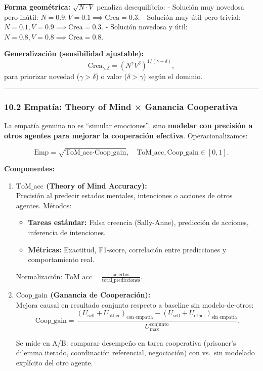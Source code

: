 \textbf{Forma geométrica:} \(\sqrt{N \cdot V}\) penaliza desequilibrio:
- Solución muy novedosa pero inútil:
\(N=0.9, V=0.1 \implies \text{Crea}=0.3\). - Solución muy útil pero
trivial: \(N=0.1, V=0.9 \implies \text{Crea}=0.3\). - Solución novedosa
y útil: \(N=0.8, V=0.8 \implies \text{Crea}=0.8\).

\textbf{Generalización (sensibilidad ajustable):} \[
\text{Crea}_{\gamma,\delta} = \left( N^\gamma V^\delta \right)^{1/(\gamma+\delta)},
\] para priorizar novedad (\(\gamma > \delta\)) o valor
(\(\delta > \gamma\)) según el dominio.

\begin{center}\rule{0.5\linewidth}{0.5pt}\end{center}

\subsubsection{10.2 Empatía: Theory of Mind × Ganancia
Cooperativa}\label{empatuxeda-theory-of-mind-ganancia-cooperativa}

La empatía genuina no es ``simular emociones'', sino \textbf{modelar con
precisión a otros agentes para mejorar la cooperación efectiva}.
Operacionalizamos:

\[
\text{Emp} = \sqrt{\text{ToM\_acc} \cdot \text{Coop\_gain}}, \quad \text{ToM\_acc}, \text{Coop\_gain} \in [0,1].
\]

\textbf{Componentes:}

\begin{enumerate}
\def\labelenumi{\arabic{enumi}.}
\item
  \textbf{\(\text{ToM\_acc}\) (Theory of Mind Accuracy):}\\
  Precisión al predecir estados mentales, intenciones o acciones de
  otros agentes. Métodos:

  \begin{itemize}
  \tightlist
  \item
    \textbf{Tareas estándar:} Falsa creencia (Sally-Anne), predicción de
    acciones, inferencia de intenciones.
  \item
    \textbf{Métricas:} Exactitud, F1-score, correlación entre
    predicciones y comportamiento real.
  \end{itemize}

  Normalización:
  \(\text{ToM\_acc} = \frac{\text{aciertos}}{\text{total\_predicciones}}\).
\item
  \textbf{\(\text{Coop\_gain}\) (Ganancia de Cooperación):}\\
  Mejora causal en resultado conjunto respecto a baseline sin
  modelo-de-otros: \[
  \text{Coop\_gain} = \frac{(U_{\text{self}} + U_{\text{other}})_{\text{con empatía}} - (U_{\text{self}} + U_{\text{other}})_{\text{sin empatía}}}{U_{\text{max}}^{\text{conjunto}}}.
  \]

  Se mide en A/B: comparar desempeño en tarea cooperativa (prisoner's
  dilemma iterado, coordinación referencial, negociación) con vs.~sin
  modelado explícito del otro agente.
\end{enumerate}

